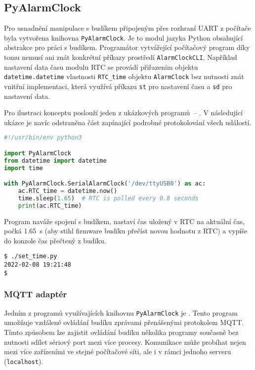 \subsection{PyAlarmClock}
Pro usnadnění manipulace s budíkem připojeným přes rozhraní UART z počítače
byla vytvořena knihovna \texttt{PyAlarmClock}. Je to modul jazyka Python
obsahující abstrakce pro práci s budíkem. Programátor vytvářející počítačový
program díky tomu nemusí ani znát konkrétní příkazy prostředí
\texttt{AlarmClockCLI}. Například nastavení data času modulu RTC se provádí
přiřazením objektu \texttt{datetime.datetime} vlastnosti \verb|RTC_time|
objektu \texttt{AlarmClock} bez nutnosti znát vnitřní implementaci, která
využívá příkazu \texttt{st} pro nastavení času a \texttt{sd} pro nastavení
data.

Pro ilustraci konceptu poslouží jeden z ukázkových programů~--
. V následující ukázce je navíc odstraněna část
zapínající podrobné protokolování všech událostí.
\begin{lstlisting}[language=Python,style=numbers]
#!/usr/bin/env python3

import PyAlarmClock
from datetime import datetime
import time

with PyAlarmClock.SerialAlarmClock('/dev/ttyUSB0') as ac:
    ac.RTC_time = datetime.now()
    time.sleep(1.65)  # RTC is polled every 0.8 seconds
    print(ac.RTC_time)
\end{lstlisting}
Program naváže spojení s budíkem, nastaví čas uložený v RTC na aktuální čas,
počká \SI{1,65}{\second} (aby stihl firmware budíku přečíst novou hodnotu
z RTC) a vypíše do konzole čas přečtený z budíku.
\begin{lstlisting}[style=terminal]
$ ./set_time.py
2022-02-08 19:21:48
$
\end{lstlisting}


\subsubsection{MQTT adaptér}
Jedním z programů využívajících knihovnu \texttt{PyAlarmClock} je
. Tento program umožňuje vzdálené ovládání
budíku zprávami přenášenými protokolem MQTT. Tímto způsobem lze zajistit
ovládání budíku několika programy současně bez nutnosti sdílet sériový port
mezi více procesy. Komunikace může probíhat nejen mezi více zařízeními ve
stejné počítačové síti, ale i v rámci jednoho serveru (\texttt{localhost}).


